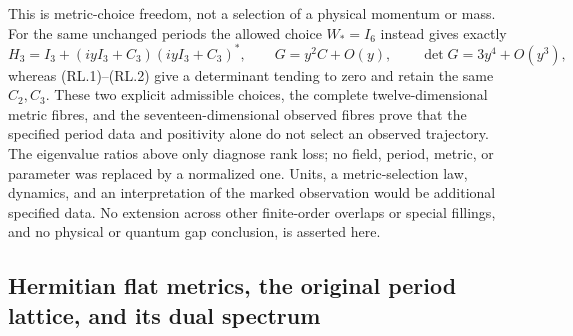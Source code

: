This is metric-choice freedom, not a selection of a physical momentum
or mass.  For the same unchanged periods the allowed choice $W_*=I_6$
instead gives exactly
\[
 H_3=I_3+(iyI_3+C_3)(iyI_3+C_3)^*,\qquad
 G=y^2C+O(y),\qquad \det G=3y^4+O(y^3),
\]
whereas (RL.1)--(RL.2) give a determinant tending to zero and retain the
same $C_2,C_3$.  These two explicit admissible choices, the complete
twelve-dimensional metric fibres, and the seventeen-dimensional observed
fibres prove that the specified period data and positivity alone do not
select an observed trajectory.  The eigenvalue ratios above only diagnose
rank loss; no field, period, metric, or parameter was replaced by a
normalized one.  Units, a metric-selection law, dynamics, and an
interpretation of the marked observation would be additional specified
data.  No extension across other finite-order overlaps or special
fillings, and no physical or quantum gap conclusion, is asserted here.

\subsection*{Hermitian flat metrics, the original period lattice, and its dual spectrum}

